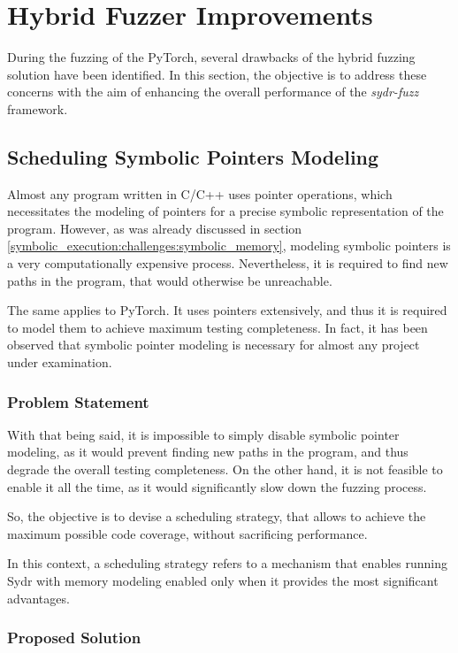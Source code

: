 \section{Hybrid Fuzzer Improvements}

During the fuzzing of the PyTorch, several drawbacks of the hybrid fuzzing solution have been identified. In this section, the objective is to address these concerns with the aim of enhancing the overall performance of the \textit{sydr-fuzz} framework.

\subsection{Scheduling Symbolic Pointers Modeling}

Almost any program written in C/C++ uses pointer operations, which necessitates the modeling of pointers for a precise symbolic representation of the program. However, as was already discussed in section \ref{symbolic_execution:challenges:symbolic_memory}, modeling symbolic pointers is a very computationally expensive process. Nevertheless, it is required to find new paths in the program, that would otherwise be unreachable.

The same applies to PyTorch. It uses pointers extensively, and thus it is required to model them to achieve maximum testing completeness. In fact, it has been observed that symbolic pointer modeling is necessary for almost any project under examination.

\subsubsection{Problem Statement}

With that being said, it is impossible to simply disable symbolic pointer modeling, as it would prevent finding new paths in the program, and thus degrade the overall testing completeness. On the other hand, it is not feasible to enable it all the time, as it would significantly slow down the fuzzing process.

So, the objective is to devise a scheduling strategy, that allows to achieve the maximum possible code coverage, without sacrificing performance.

In this context, a scheduling strategy refers to a mechanism that enables running Sydr with memory modeling enabled only when it provides the most significant advantages.

\subsubsection{Proposed Solution}

